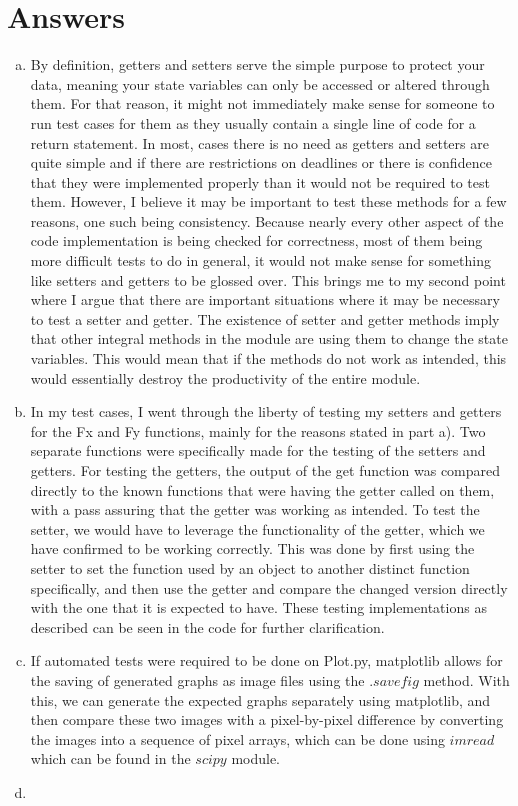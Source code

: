 \documentclass[12pt]{article}
\begin{document}
\section{Answers}

\begin{enumerate}[a)]

\item By definition, getters and setters serve the simple purpose to protect your data, meaning your state variables can only be accessed or altered through them. For that reason, it might not immediately make sense for someone to run test cases for them as they usually contain a single line of code for a return statement. In most, cases there is no need as getters and setters are quite simple and if there are restrictions on deadlines or there is confidence that they were implemented properly than it would not be required to test them.  However, I believe it may be important to test these methods for a few reasons, one such being consistency. Because nearly every other aspect of the code implementation is being checked for correctness, most of them being more difficult tests to do in general, it would not make sense for something like setters and getters to be glossed over. This brings me to my second point where I argue that there are important situations where it may be necessary to test a setter and getter. The existence of setter and getter methods imply that other integral methods in the module are using them to change the state variables. This would mean that if the methods do not work as intended, this would essentially destroy the productivity of the entire module.
\item In my test cases, I went through the liberty of testing my setters and getters for the Fx and Fy functions, mainly for the reasons stated in part a). Two separate functions were specifically made for the testing of the setters and getters. For testing the getters, the output of the get function was compared directly to the known functions that were having the getter called on them, with a pass assuring that the getter was working as intended. To test the setter, we would have to leverage the functionality of the getter, which we have confirmed to be working correctly. This was done by first using the setter to set the function used by an object to another distinct function specifically, and then use the getter and compare the changed version directly with the one that it is expected to have. These testing implementations as described can be seen in the code for further clarification.
\item If automated tests were required to be done on Plot.py, matplotlib allows for the saving of generated graphs as image files using the $.savefig$ method. With this, we can generate the expected graphs separately using matplotlib, and then compare these two images with a pixel-by-pixel difference by converting the images into a sequence of pixel arrays, which can be done using $imread$ which can be found in the $scipy$ module.
\item


\end{enumerate}
\end{document}
